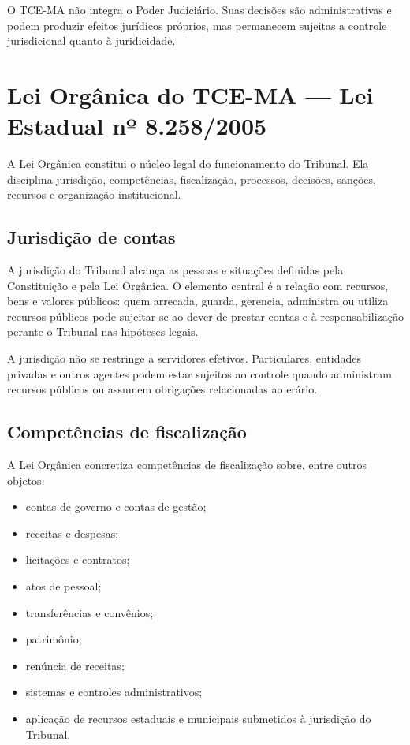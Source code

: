 O TCE-MA não integra o Poder Judiciário. Suas decisões são administrativas e podem produzir efeitos jurídicos próprios, mas permanecem sujeitas a controle jurisdicional quanto à juridicidade.

\section{Lei Orgânica do TCE-MA — Lei Estadual nº 8.258/2005}

A Lei Orgânica constitui o núcleo legal do funcionamento do Tribunal. Ela disciplina jurisdição, competências, fiscalização, processos, decisões, sanções, recursos e organização institucional.

\subsection{Jurisdição de contas}

A jurisdição do Tribunal alcança as pessoas e situações definidas pela Constituição e pela Lei Orgânica. O elemento central é a relação com recursos, bens e valores públicos: quem arrecada, guarda, gerencia, administra ou utiliza recursos públicos pode sujeitar-se ao dever de prestar contas e à responsabilização perante o Tribunal nas hipóteses legais.

A jurisdição não se restringe a servidores efetivos. Particulares, entidades privadas e outros agentes podem estar sujeitos ao controle quando administram recursos públicos ou assumem obrigações relacionadas ao erário.

\subsection{Competências de fiscalização}

A Lei Orgânica concretiza competências de fiscalização sobre, entre outros objetos:
\begin{itemize}
\item contas de governo e contas de gestão;
\item receitas e despesas;
\item licitações e contratos;
\item atos de pessoal;
\item transferências e convênios;
\item patrimônio;
\item renúncia de receitas;
\item sistemas e controles administrativos;
\item aplicação de recursos estaduais e municipais submetidos à jurisdição do Tribunal.
\end{itemize}

